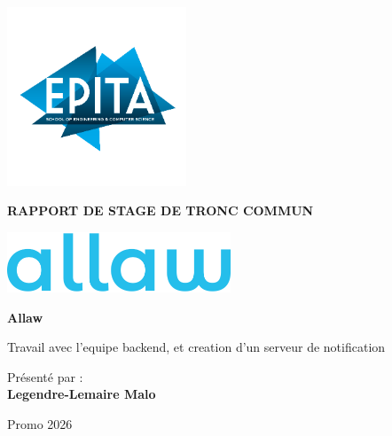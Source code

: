 \begin{titlepage}
\begin{center}
\includegraphics[width=0.4\textwidth]{media/image1.png}

\vspace{1cm}
{\huge\bfseries RAPPORT DE STAGE DE TRONC COMMUN\par}
\vspace{1cm}

\includegraphics[width=0.5\textwidth]{media/allaw.png}

\vspace{1.5cm}
{\Large\bfseries Allaw\par}
\vspace{0.5cm}
{\large Travail avec l'equipe backend, et creation d'un serveur de notification\par}

\vfill  %

{\large Présenté par :\\
\textbf{Legendre-Lemaire Malo}\par}  %

\vspace{0.5cm}
{\large Promo 2026\par}  %
\end{center}
\end{titlepage}

